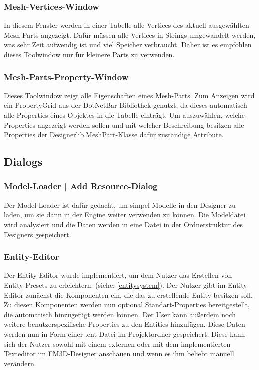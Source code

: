 \subsubsection{Mesh-Vertices-Window}
In diesem Fenster werden in einer Tabelle alle Vertices des aktuell ausgewählten Mesh-Parts angezeigt. Dafür müssen alle Vertices in Strings umgewandelt werden, was sehr Zeit aufwendig ist und viel Speicher verbraucht. Daher ist es empfohlen dieses Toolwindow nur für kleinere Parts zu verwenden. 

\subsubsection{Mesh-Parts-Property-Window}
Dieses Toolwindow zeigt alle Eigenschaften eines Mesh-Parts. Zum Anzeigen wird ein PropertyGrid aus der DotNetBar-Bibliothek genutzt, da dieses automatisch alle Properties eines Objektes in die Tabelle einträgt. Um auszuwählen, welche Properties angezeigt werden sollen und mit welcher Beschreibung besitzen alle Properties der Designerlib.MeshPart-Klasse dafür zuständige Attribute.

\subsection{Dialogs}
\subsubsection{Model-Loader | Add Resource-Dialog}
Der Model-Loader ist dafür gedacht, um simpel Modelle in den Designer zu laden, um sie dann in der Engine weiter verwenden zu können. Die Modeldatei wird analysiert und die Daten werden in eine Datei in der Ordnerstruktur des Designers gespeichert.

\subsubsection{Entity-Editor}
\label{entityeditor}
Der Entity-Editor wurde implementiert, um dem Nutzer das Erstellen von Entity-Presets zu erleichtern. (siehe: \ref{entitysystem}). Der Nutzer gibt im Entity-Editor zunächst die Komponenten ein, die das zu erstellende Entity besitzen soll. Zu diesen Komponenten werden nun optional Standart-Properties bereitgestellt, die automatisch hinzugefügt werden können. Der User kann außerdem noch weitere benutzerspezifische Properties zu den Entities hinzufügen. Diese Daten werden nun in Form einer .ent Datei im Projektordner gespeichert. Diese kann sich der Nutzer sowohl mit einem externen oder mit dem implementierten Texteditor im FM3D-Designer anschauen und wenn es ihm beliebt manuell verändern.